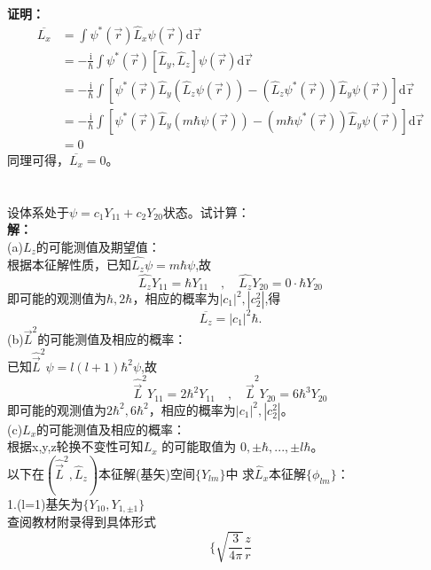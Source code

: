 \documentclass[a4paper]{article}
\newcommand{\qed}{
    \rightline{Q.E.D.}\\
    }
\begin{document}
\begin{CJK*}{UTF8}{song}
    {
    \textbf{证明：}
    \begin{equation*}
    \begin{split}
    \overline{L_{x}}
        & = \int\psi^{*}(\vec{r})\hat{L}_{x}\psi(\vec{r})\mathrm{d\vec{r}}\\
        & = -\frac{\mathrm{i}}{\hbar}\int\psi^{*}(\vec{r})
           [\hat{L}_{y},\hat{L}_{z}]\psi(\vec{r})\mathrm{d\vec{r}}\\
        & = -\frac{\mathrm{i}}{\hbar}\int[\psi^{*}(\vec{r})\hat{L}_{y}(\hat{L}_{z}\psi(\vec{r}))
            -(\hat{L}_{z}\psi^{*}(\vec{r}))\hat{L}_{y}\psi(\vec{r})]\mathrm{d\vec{r}}\\
        & = -\frac{\mathrm{i}}{\hbar}\int[\psi^{*}(\vec{r})\hat{L}_{y}(m\hbar\psi(\vec{r}))
            -(m\hbar\psi^{*}(\vec{r}))\hat{L}_{y}\psi(\vec{r})]\mathrm{d\vec{r}}\\
        & = 0            
    \end{split}
    \end{equation*}
    同理可得，$\overline{L_{x}}=0$。\\
    \qed
    }\\[20pt]    
     设体系处于$\psi = c_{1}Y_{11}+c_{2}Y_{20}$状态。试计算：\\[8pt]
    {
    \textbf{解：}\\[5pt]
    (a)$L_{z}$的可能测值及期望值：\\
    根据本征解性质，已知$\hat{L_{z}}\psi = m\hbar\psi$,故
    $$\hat{L_{z}}Y_{11}=\hbar Y_{11}\quad,\quad\hat{L_{z}}Y_{20}=0\cdot\hbar Y_{20}$$
    即可能的观测值为$\hbar,2\hbar$，相应的概率为$|c_{1}|^{2},|c_{2}^{2}|$,得
    $$\overline{L_{z}}=|c_{1}|^{2}\hbar.$$
    (b)$\vec{L}^{2}$的可能测值及相应的概率：\\
    已知$\hat{\vec{L}}^{2}\psi = l(l+1)\hbar^{2}\psi$,故
    $$\hat{\vec{L}}^{2}Y_{11}=2\hbar^{2} Y_{11}\quad,
        \quad\hat{\vec{L}}^{2}Y_{20}=6\hbar^{3} Y_{20}$$
    即可能的观测值为$2\hbar^{2},6\hbar^{2}$，相应的概率为$|c_{1}|^{2},|c_{2}^{2}|$。\\[5pt]
    (c)$L_{x}$的可能测值及相应的概率：\\
    根据x,y,z轮换不变性可知$L_{x}$ 的可能取值为 $0,\pm\hbar,...,\pm l\hbar$。\\
    以下在$(\hat{\vec{L}}^{2},\hat{L}_{z})$本征解(基矢)空间$\{Y_{lm}\}$中
        求$\hat{L}_{x}$本征解$\{\phi_{lm}\}$：\\
    1.(l=1)基矢为$\{Y_{10},Y_{1,\pm1}\}$\\
    \indent 查阅教材附录得到具体形式
    $$\{\sqrt{\frac{3}{4\pi}}\frac{z}{r}
$$}
\end{CJK*}
\end{document}
